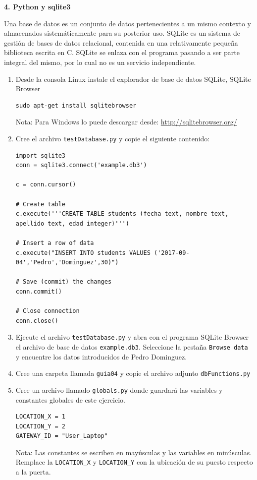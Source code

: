 \documentclass[10pt,letterpaper]{article}
\begin{document}
\begin{center}
\textbf{4. Python y sqlite3}
\end{center}
Una base de datos es un conjunto de datos pertenecientes a un mismo contexto y almacenados sistemáticamente para su posterior uso. SQLite  es un sistema de gestión de bases de datos relacional, contenida en una relativamente pequeña  biblioteca escrita en C. SQLite se enlaza con el programa pasando a ser parte integral del mismo, por lo cual no es un servicio independiente. 


\begin{enumerate}

\item Desde la consola Linux instale el explorador de base de datos SQLite, SQLite Browser

\begin{verbatim}
sudo apt-get install sqlitebrowser
\end{verbatim}

Nota: Para Windows lo puede descargar desde: \url{http://sqlitebrowser.org/}

\item Cree el archivo \verb|testDatabase.py| y copie el siguiente contenido: 
\begin{lstlisting}[style=myCustomPythonStyle]
import sqlite3
conn = sqlite3.connect('example.db3')

c = conn.cursor()

# Create table
c.execute('''CREATE TABLE students (fecha text, nombre text, apellido text, edad integer)''')

# Insert a row of data
c.execute("INSERT INTO students VALUES ('2017-09-04','Pedro','Dominguez',30)")

# Save (commit) the changes
conn.commit()

# Close connection
conn.close()
\end{lstlisting}

\item Ejecute el archivo \verb|testDatabase.py| y abra con el programa SQLite Browser el archivo de base de datos \verb|example.db3|. Seleccione la pestaña \verb|Browse data| y encuentre los datos introducidos de Pedro Dominguez.

\item Cree una carpeta llamada \verb|guia04| y copie el archivo adjunto \verb|dbFunctions.py|

\item Cree un archivo llamado \verb|globals.py| donde guardará las variables y constantes globales de este ejercicio.
\begin{lstlisting}[style=myCustomPythonStyle]
LOCATION_X = 1
LOCATION_Y = 2
GATEWAY_ID = "User_Laptop"
\end{lstlisting}
Nota: Las constantes se escriben en mayúsculas y las variables en minúsculas. Remplace la \verb|LOCATION_X| y \verb|LOCATION_Y| con la ubicación de su puesto respecto a la puerta. 


\end{enumerate}
\end{document}
